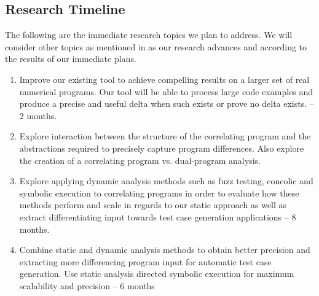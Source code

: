 \subsection{Research Timeline}
The following are the immediate research topics we plan to address. We will consider other topics as mentioned in  as our research advances and according to the results of our immediate plans.

\begin{enumerate}
\item Improve our existing tool to achieve compelling results on a larger set of real numerical programs. Our tool will be able to process large code examples and produce a precise and useful delta when such exists or prove no delta exists. -- 2 months.
\item Explore interaction between the structure of the correlating program and the abstractions required to precisely capture program differences. Also explore the creation of a correlating program vs. dual-program analysis.
\item Explore applying dynamic analysis methods such as fuzz testing, concolic and symbolic execution to correlating programs in order to evaluate how these methods perform and scale in regards to our static approach as well as extract differentiating input towards test case generation applications -- 8 months.
\item Combine static and dynamic analysis methods to obtain better precision and extracting more differencing program input for automatic test case generation. Use static analysis directed symbolic execution for maximum scalability and precision -- 6 months
\end{enumerate}
